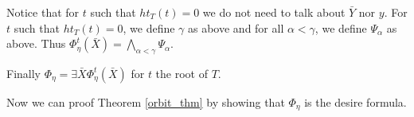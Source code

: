 \documentclass[12pt,a4paper]{amsart}
\theoremstyle{definition}
\theoremstyle{remark}
\begin{document}

Notice that for $t$ such that $ht_T(t)=0$ we do not need to talk about $\bar Y$ nor $y$.
For $t$ such that $ht_T(t)=0$, we define $\gamma$ as above and for all $\alpha<\gamma$, we define $\Psi_\alpha$ as above. Thus $\Phi^t_\eta(\bar X)=\bigwedge_{\alpha<\gamma}\Psi_\alpha$. %

Finally $\Phi_\eta=\exists\bar X \Phi^t_\eta(\bar X)$ for $t$ the root of $T$.%

Now we can proof Theorem \ref{orbit_thm} by showing that $\Phi_\eta$ is the desire formula.
\end{document}
